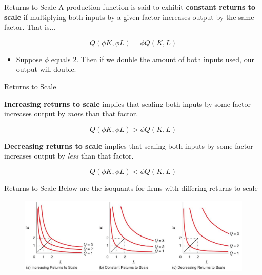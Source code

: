 \documentclass[11pt,t]{beamer}
\begin{document}
\begin{frame}{Returns to Scale}
  A production function is said to exhibit \textbf{constant returns to scale} if multiplying both inputs by a given factor increases output by the same factor. That is...
  
  $$
    Q(\phi K, \phi L) = \phi Q(K,L)
  $$
  
  \bigskip\pause
  \begin{itemize}
    \item Suppose $\phi$ equals 2. Then if we double the amount of both inputs used, our output will double.
  \end{itemize}
\end{frame}

\begin{frame}{Returns to Scale}
  
  \textbf{Increasing returns to scale} implies that scaling both inputs by some factor increases output by \textit{more} than that factor.

  $$
    Q(\phi K, \phi L) > \phi Q(K,L)
  $$

  \bigskip
  \textbf{Decreasing returns to scale} implies that scaling both inputs by some factor increases output by \textit{less} than that factor.

  $$
    Q(\phi K, \phi L) < \phi Q(K,L)
  $$
\end{frame}

\begin{frame}{Returns to Scale}
  Below are the isoquants for firms with differing returns to scale

  \bigskip
  \begin{figure}
    \includegraphics[width = \linewidth]{figures/fig6_18.jpg}
  \end{figure}
\end{frame}
\end{document}
